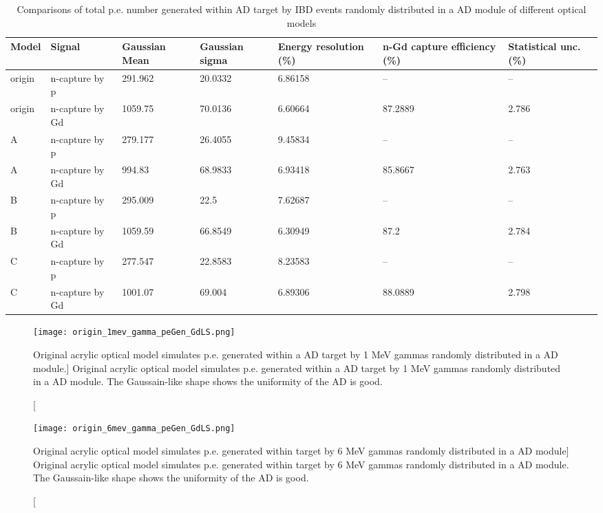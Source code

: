 \begin{table}
\centering
\caption{Comparisons of total p.e. number generated within AD target by IBD events randomly distributed
in a AD module of different optical models}
\label{tab:peGenGdLSOpModelIBD}
\begin{tabular}{llp{1.5cm}p{1.5cm}p{2.0cm}p{2.7cm}p{2.5cm}}
Model & Signal &  Gaussian Mean  &  Gaussian sigma & Energy resolution (\%) & n-Gd capture efficiency (\%) & Statistical unc. (\%) \\
\hline
\hline
origin  & n-capture by p    & 291.962 & 20.0332 & 6.86158 & -- & -- \\
origin  & n-capture by Gd   & 1059.75 & 70.0136 & 6.60664 & 87.2889 & 2.786\\
A       & n-capture by p    & 279.177 & 26.4055 & 9.45834 & -- & -- \\
A       & n-capture by Gd   & 994.83  & 68.9833 & 6.93418 & 85.8667 & 2.763 \\
B       & n-capture by p    & 295.009 & 22.5 & 7.62687 & -- & -- \\
B       & n-capture by Gd   & 1059.59 & 66.8549 & 6.30949 & 87.2 & 2.784 \\
C       & n-capture by p    & 277.547 & 22.8583 & 8.23583 & -- & -- \\
C       & n-capture by Gd   & 1001.07 & 69.004 & 6.89306 &  88.0889 & 2.798 \\
\hline
\end{tabular}
\end{table}


\begin{figure}
    \centering
    \label{fig:origin_1mev_gamma_peGen_GdLS}
    \texttt{[image: origin\_1mev\_gamma\_peGen\_GdLS.png]}
    \caption
[Original acrylic optical model simulates p.e. generated within a AD target by 1 MeV gammas randomly distributed in a AD module.]
{Original acrylic optical model simulates p.e. generated within a AD target by 1 MeV gammas randomly distributed in a AD module. The Gaussain-like shape shows the uniformity of the AD is good.}
    \end{figure}


\begin{figure}
    \centering
    \texttt{[image: origin\_6mev\_gamma\_peGen\_GdLS.png]}
    \caption
    [Original acrylic optical model simulates p.e. generated within target by 6 MeV gammas randomly distributed in a AD module]
    {Original acrylic optical model simulates p.e. generated within target by 6 MeV gammas randomly distributed in a AD module. The Gaussain-like shape shows the uniformity of the AD is good.}
    \label{fig:origin_6mev_gamma_peGen_GdLS}
    \end{figure}


